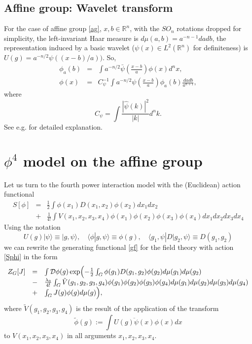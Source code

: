 \documentclass[a4paper,a4paper]{article}
\def\bra{\langle}
\def\ket{\rangle}
\newcommand{\R}{\mathbb{R}}
\def\cD{{\mathcal D}}             %
\def\bra{\langle}
\def\ket{\rangle}
\begin{document}
\subsection{Affine group: Wavelet transform}
For the case of affine group \eqref{ag}, $x,b\in\R^n$, with the $SO_n$ 
rotations dropped for simplicity, the left-invariant 
Haar measure is $d\mu(a,b) = a^{-n-1}da db$, the representation induced 
by a basic wavelet ($\psi(x)\in L^2(\R^n)$ for definiteness) is 
$U(g)=a^{-n/2}\psi((x-b)/a))$. So,
\begin{equation}
\begin{array}{lcl}
\phi_a(b) &=& \int  a^{-n/2}\bar\psi\left(\frac{x-b}{a}\right)\phi(x)d^nx, \\
\phi(x)&=& C_\psi^{-1}\int a^{-n/2}\psi\left(\frac{x-b}{a}\right)\phi_a(b)
\frac{dadb}{a^{n+1}},
\end{array} 
\label{wtl2}
\end{equation} 
where 
\begin{equation}
C_\psi = \int \frac{|\hat\psi(k)|^2}{|k|}d^nk.
\label{adcf}
\end{equation}
See e.g. \cite{Chui} for detailed explanation. 

\section{$\phi^4$ model on the affine group} 
Let us turn to the fourth power interaction model with the (Euclidean) 
action functional 
\begin{equation}
\begin{array}{lcl}
S[\phi] &=& \frac{1}{2}\int \phi(x_1)D(x_1,x_2)\phi(x_2)dx_1dx_2  \\
        &+& \frac{1}{4!}\int V(x_1,x_2,x_3,x_4)\phi(x_1)\phi(x_2)\phi(x_3)
          \phi(x_4)dx_1dx_2 dx_3dx_4
\label{Sphi}
\end{array}
\end{equation}
Using the notation 
$$U(g)|\psi\ket \equiv |g,\psi\ket, \quad \bra\phi|g,\psi\ket \equiv \phi(g),
\quad \bra g_1,\psi|D|g_2,\psi\ket \equiv D(g_1,g_2)
$$
we can rewrite the generating functional \eqref{gf} for the field theory 
with action \eqref{Sphi} in the form 
\begin{equation}
\begin{array}{lcl}
Z_G[J] &=& \int \cD\phi(g) \exp\Bigl(
-\frac{1}{2}\int_G \phi(g_1)D(g_1,g_2)\phi(g_2)d\mu(g_1) d\mu(g_2) \\
&-&\frac{\lambda_0}{4!}\int_G \tilde V(g_1,g_2,g_3,g_4)
\phi(g_1)\phi(g_2)\phi(g_3)\phi(g_4)
d\mu(g_1) d\mu(g_2)d\mu(g_3) d\mu(g_4)  \\
&+& \int_G J(g)\phi(g)d\mu(g)
\Bigr),
\end{array}
\label{gfi4}
\end{equation}
where $\tilde V(g_1,g_2,g_3,g_4)$ is the result of the application of 
the transform $$\tilde\phi(g) := \int\overline{U(g)\psi(x)} \phi(x)dx$$ 
to $V(x_1,x_2,x_3,x_4)$ in all arguments $x_1,x_2,x_3,x_4$.
\end{document}
